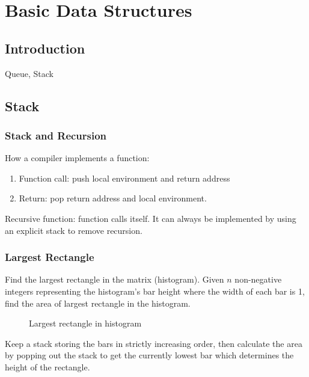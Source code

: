 \chapter{Basic Data Structures}


\section{Introduction}
Queue, Stack

\section{Stack}
\subsection{Stack and Recursion}
How a compiler implements a function:
\begin{enumerate}
\item Function call: push local environment and return address
\item Return: pop return address and local environment. 
\end{enumerate}

Recursive function: function calls itself. It can always be implemented by using an explicit stack to remove recursion. 

\subsection{Largest Rectangle}
Find the largest rectangle in the matrix (histogram). Given $n$ non-negative integers representing the histogram's bar height where the width of each bar is 1, find the area of largest rectangle in the histogram. 

\begin{figure}[hbtp]
\centering
{}
\caption{Largest rectangle in histogram}
\label{fig:histogram_area}
\end{figure}

Keep a stack storing the bars in strictly increasing order, then calculate the area by popping out the stack to get the currently lowest bar which determines the height of the rectangle.

